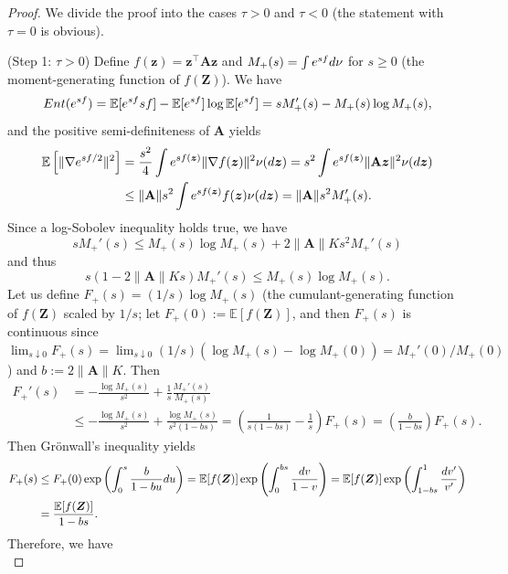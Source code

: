 \documentclass[10pt,a4paper]{amsart}
\newcommand{\Ent}{\textnormal{Ent}}
\newcommand{\E}{\mathbb{E}}
\newcommand{\bZ}{\boldsymbol{Z}}
\newcommand{\bfA}{\mathbf{A}}
\newcommand{\bz}{\boldsymbol{z}}
\newcommand{\diff}{\textnormal{d}}
\begin{document}
\begin{proof}
We divide the proof into the cases $\tau > 0$ and $\tau < 0$ (the statement with $\tau=0$ is obvious).

(Step 1: $\tau>0$)
Define $f(\bz)=\bz^{\top}\bfA\bz$ and $M_{+}(s)=\int e^{sf}\diff\nu$ for $s\ge0$ (the moment-generating function of $f(\bZ)$).
We have
\begin{equation*}
    \Ent( e^{sf})=\E[ e^{sf}sf]-\E[e^{sf}]\log\E[e^{sf}]=sM_{+}'(s)-M_{+}(s)\log M_{+}(s),
\end{equation*}
and the positive semi-definiteness of $\bfA$ yields
\begin{align*}
    \E\left[\|\nabla e^{sf/2}\|^{2}\right]&=\frac{s^{2}}{4}\int e^{sf(\bz)}\|\nabla f(\bz)\|^{2}\nu(\diff\bz)= s^{2}\int e^{sf(\bz)}\|\bfA\bz\|^{2}\nu(\diff\bz)\\
    &\le \|\bfA\|s^{2}\int e^{sf(\bz)}f(\bz)\nu(\diff\bz)= \|\bfA\|s^{2}M_{+}'(s).
\end{align*}
Since a log-Sobolev inequality holds true, we have
\begin{equation*}
    sM_{+}'(s)\le M_{+}(s)\log M_{+} (s)  +2\|\bfA\|Ks^{2}M_{+}'(s)
\end{equation*}
and thus 
\begin{equation*}
    s(1-2\|\bfA\|Ks)M_{+}'(s)\le M_{+}(s)\log M_{+}(s).
\end{equation*}
Let us define $F_{+}(s)=(1/s)\log M_{+}(s)$ (the cumulant-generating function of $f(\bZ)$ scaled by $1/s$; let $F_{+}(0):=\E[f(\bZ)]$, and then $F_{+}(s)$ is continuous since $\lim_{s\downarrow0}F_{+}(s)=\lim_{s\downarrow0}(1/s)(\log M_{+}(s)-\log M_{+}(0))=M_{+}'(0)/M_{+}(0)$) and $b:=2\|\bfA\|K$.
Then
\begin{align*}
    F_{+}'(s)&=-\frac{\log M_{+}(s)}{s^{2}}+\frac{1}{s}\frac{M_{+}'(s)}{M_{+}(s)}\\
    &\le -\frac{\log M_{+}(s)}{s^{2}}+\frac{\log M_{+}(s)}{s^{2}(1-bs)}=\left(\frac{1}{s(1-bs)}-\frac{1}{s}\right)F_{+}(s)=\left(\frac{b}{1-bs}\right)F_{+}(s).
\end{align*}
Then Gr\"{o}nwall's inequality yields
\begin{align*}
    F_{+}(s)&\le F_{+}(0)\exp\left(\int_{0}^{s}\frac{b}{1-bu}\diff u\right)=\E[f(\bZ)]\exp\left(\int_{0}^{bs}\frac{\diff v}{1-v}\right)=\E[f(\bZ)]\exp\left(\int_{1-bs}^{1}\frac{\diff v'}{v'}\right)\\
    &=\frac{\E[f(\bZ)]}{1-bs}.
\end{align*}
Therefore, we have
\begin{equation*}

\end{equation*}
\end{proof}
\end{document}
